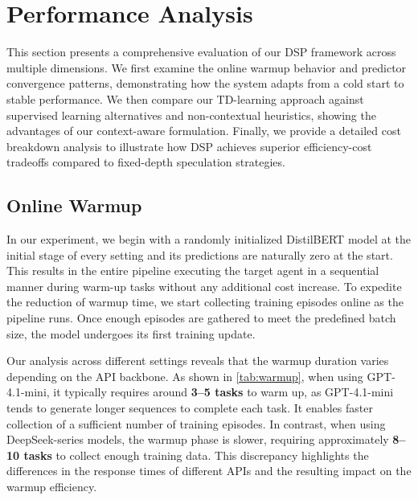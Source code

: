 \section{Performance Analysis}
This section presents a comprehensive evaluation of our DSP framework across multiple dimensions. We first examine the online warmup behavior and predictor convergence patterns, demonstrating how the system adapts from a cold start to stable performance. We then compare our TD-learning approach against supervised learning alternatives and non-contextual heuristics, showing the advantages of our context-aware formulation. Finally, we provide a detailed cost breakdown analysis to illustrate how DSP achieves superior efficiency-cost tradeoffs compared to fixed-depth speculation strategies.

\subsection{Online Warmup}
In our experiment, we begin with a randomly initialized DistilBERT model at the initial stage of every setting and its predictions are naturally zero at the start. This results in the entire pipeline executing the target agent in a sequential manner during warm-up tasks without any additional cost increase. To expedite the reduction of warmup time, we start collecting training episodes online as the pipeline runs. Once enough episodes are gathered to meet the predefined batch size, the model undergoes its first training update. 

Our analysis across different settings reveals that the warmup duration varies depending on the API backbone. As shown in \cref{tab:warmup}, when using GPT-4.1-mini, it typically requires around \textbf{3–5 tasks} to warm up, as GPT-4.1-mini tends to generate longer sequences to complete each task. It enables faster collection of a sufficient number of training episodes. In contrast, when using DeepSeek-series models, the warmup phase is slower, requiring approximately \textbf{8–10 tasks} to collect enough training data. This discrepancy highlights the differences in the response times of different APIs and the resulting impact on the warmup efficiency.

